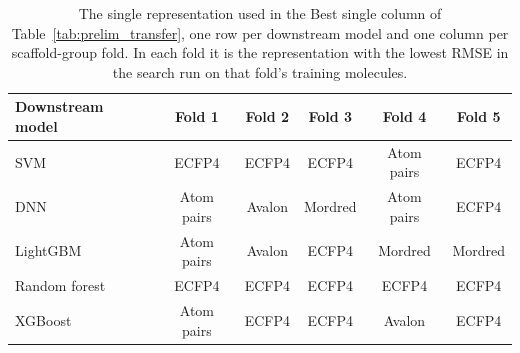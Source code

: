 \begin{table}[htbp]
\centering
\small
\begin{tabular}{@{}lccccc@{}}
\toprule
Downstream model & Fold 1 & Fold 2 & Fold 3 & Fold 4 & Fold 5 \\
\midrule
SVM & ECFP4 & ECFP4 & ECFP4 & Atom pairs & ECFP4 \\
DNN & Atom pairs & Avalon & Mordred & Atom pairs & ECFP4 \\
LightGBM & Atom pairs & Avalon & ECFP4 & Mordred & Mordred \\
Random forest & ECFP4 & ECFP4 & ECFP4 & ECFP4 & ECFP4 \\
XGBoost & Atom pairs & ECFP4 & ECFP4 & Avalon & ECFP4 \\
\bottomrule
\end{tabular}
\caption[Best single representation per fold on hERG $K_i$.]{The single representation used in the Best single column of Table~\ref{tab:prelim_transfer}, one row per downstream model and one column per scaffold-group fold. In each fold it is the representation with the lowest RMSE in the search run on that fold's training molecules.}
\label{tab:prelim_transfer_single}
\end{table}

